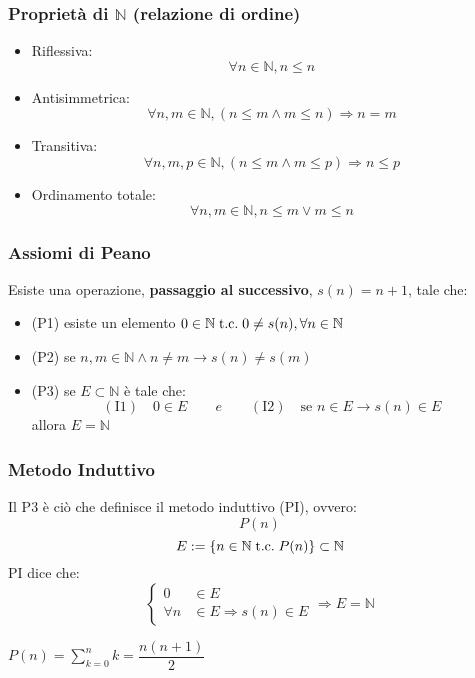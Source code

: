 \documentclass[a4paper,12pt]{article}
\begin{document}
	\subsubsection{Proprietà di $\mathbb{N}$ (relazione di ordine)}
	\begin{itemize}
		\item Riflessiva:
		\[\forall n \in \mathbb{N}, n \leq n\]
		\item Antisimmetrica:
		\[\forall n, m \in \mathbb{N}, (n \leq m \wedge m\leq n) \Rightarrow n = m\]
		\item Transitiva:
		\[\forall n, m, p \in \mathbb{N}, (n \leq m \wedge m \leq p) \Rightarrow n \leq p\]
		\item Ordinamento totale:
		\[\forall n, m \in \mathbb{N}, n\leq m \vee m \leq n\]
	\end{itemize}
	
	\subsubsection{Assiomi di Peano}
	Esiste una operazione, \textbf{passaggio al successivo}, $s(n) = n + 1$, tale che:
	\begin{itemize}
		\item (P1) esiste un elemento $0 \in \mathbb{N} \;\text{t.c.}\; 0 \not = s(n), \forall n \in \mathbb{N}$
		\item (P2) se $n,m \in \mathbb{N} \wedge n \not = m \rightarrow s(n) \not = s(m)$
		\item (P3) se $E \subset \mathbb{N}$ è tale che:
		\[ (\text{I1})\quad 0 \in E \quad \quad e \quad \quad (\text{I2})\quad \text{se } n \in E \rightarrow s(n) \in E\]
		allora $E = \mathbb{N}$
	\end{itemize}
	
	\subsubsection{Metodo Induttivo}
	Il P3 è ciò che definisce il metodo induttivo (PI), ovvero:
	\[P(n)\]
	\[E := \{n \in \mathbb{N} \;\text{t.c.}\; P(n)\} \subset \mathbb{N}\]
	PI dice che:
	\[
	\left\{
	\begin{aligned}
		0 &\in E \\
		\forall n &\in E \Rightarrow s(n) \in E
	\end{aligned}\right. \Rightarrow E = \mathbb{N}\]
	
	\begin{proposition}
		$\displaystyle P(n) = \sum_{k=0}^{n} k = \dfrac{n(n+1)}{2}$
	\end{proposition}
	
\end{document}
